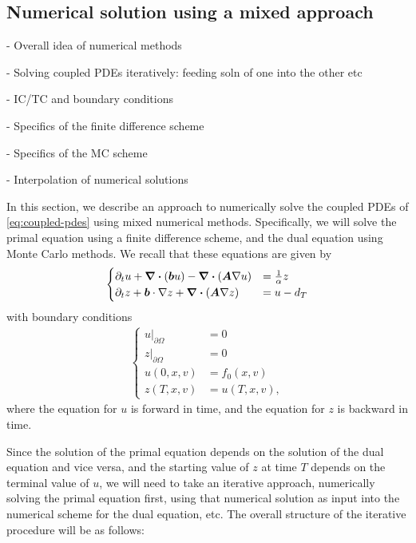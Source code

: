 \documentclass{article}  %
\begin{document}
\subsection{Numerical solution using a mixed approach}

- Overall idea of numerical methods

- Solving coupled PDEs iteratively: feeding soln of one into the other etc

- IC/TC and boundary conditions

- Specifics of the finite difference scheme 

- Specifics of the MC scheme 

- Interpolation of numerical solutions

In this section, we describe an approach to numerically solve the coupled PDEs of \autoref{eq:coupled-pdes} using mixed numerical methods. Specifically, we will solve the primal equation using a finite difference scheme, and the dual equation using Monte Carlo methods. We recall that these equations are given by 
%
\begin{align} 
    \begin{cases} 
        \partial_t u + \div{(\boldsymbol{b}u)} - \div{(\boldsymbol{A} \nabla u)} &= \frac{1}{\alpha} z\\
        \partial_t z + \boldsymbol{b} \cdot \nabla z + \div{(\boldsymbol{A} \nabla z)} &= u - d_T
    \end{cases}
\end{align}
%
with boundary conditions 
%
\begin{align}
    \begin{cases} 
        {u \rvert}_{\partial \Omega} &= 0\\
        {z \rvert}_{\partial \Omega} &= 0\\
        u(0,x,v) &= f_0(x,v)\\
        z(T,x,v) &= u(T,x,v),
    \end{cases} 
\end{align}
%
where the equation for $u$ is forward in time, and the equation for $z$ is backward in time. 

Since the solution of the primal equation depends on the solution of the dual equation and vice versa, and the starting value of $z$ at time $T$ depends on the terminal value of $u$, we will need to take an iterative approach, numerically solving the primal equation first, using that numerical solution as input into the numerical scheme for the dual equation, etc. The overall structure of the iterative procedure will be as follows:
\end{document}

